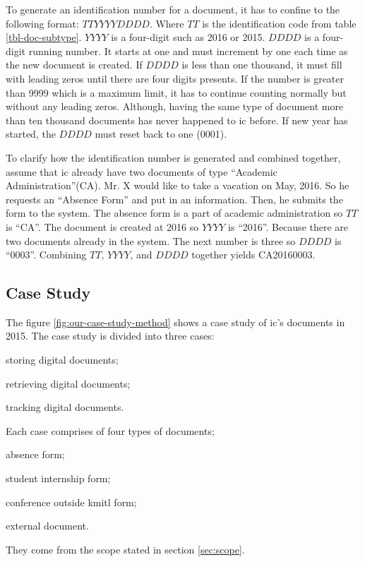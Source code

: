 To generate an identification number for a document, it has to confine to the following format: $TTYYYYDDDD$.
Where $TT$ is the identification code from table \ref{tbl-doc-subtype}.
$YYYY$ is a four-digit such as 2016 or 2015.
$DDDD$ is a four-digit running number.
It starts at one and must increment by one each time as the new document is created.
If $DDDD$ is less than one thousand, it must fill with leading zeros until there are four digits presents.
If the number is greater than 9999 which is a maximum limit, it has to continue counting normally but without any leading zeros.
Although, having the same type of document more than ten thousand documents has never happened to \gls{ic} before.
If new year has started, the $DDDD$ must reset back to one (0001).

To clarify how the identification number is generated and combined together, assume that \gls{ic} already have two documents of type \enquote{Academic Administration}(CA).
Mr. X would like to take a vacation on May, 2016.
So he requests an \enquote{Absence Form} and put in an information.
Then, he submits the form to the system.
The absence form is a part of academic administration so $TT$ is \enquote{CA}.
The document is created at 2016 so $YYYY$ is \enquote{2016}.
Because there are two documents already in the system.
The next number is three so $DDDD$ is \enquote{0003}.
Combining $TT$, $YYYY$, and $DDDD$ together yields CA20160003.

\subsection{Case Study}
The figure \ref{fig:our-case-study-method} shows a case study of \gls{ic}'s documents in 2015.
The case study is divided into three cases:
\begin{enumerate*}
	\item storing digital documents;
	\item retrieving digital documents;
	\item tracking digital documents.
\end{enumerate*}
Each case comprises of four types of documents;
\begin{enumerate*}
	\item absence form;
	\item student internship form;
	\item conference outside \gls{kmitl} form;
	\item external document.
\end{enumerate*}
They come from the scope stated in section \ref{sec:scope}.

